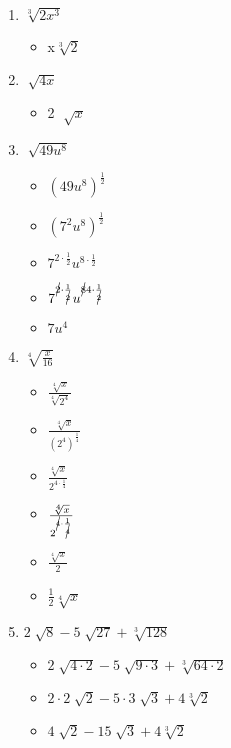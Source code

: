 \documentclass{article}
\begin{document}
\begin{onehalfspace}
\begin{enumerate}[start=29]
        \item $\sqrt[3]{2x^{3}}$
        \begin{itemize}
            \item x$\sqrt[3]{2}$
        \end{itemize}

        \item $\sqrt[]{4x}$
        \begin{itemize}
            \item 2 $\sqrt[]{x}$
        \end{itemize}

        \item $\sqrt[]{49u^{8}}$
        \begin{itemize}
            \item $(49u^{8})^{\frac{1}{2}}$
            \item $(7^{2}u^{8})^{\frac{1}{2}}$
            \item $7^{2 \cdot \frac{1}{2}}u^{8 \cdot \frac{1}{2}}$
            \item $7^{\cancel{2} \cdot \frac{1}{\cancel{2}}}u^{\cancel{8}4 \cdot \frac{1}{\cancel{2}}}$
            \item $7u^{4}$
        \end{itemize}

        \item $\sqrt[4]{\frac{x}{16}}$
        \begin{itemize}
            \item $\frac{\sqrt[4]{x}}{\sqrt[4]{2^{4}}}$
            \item $\frac{\sqrt[4]{x}}{(2^{4})^{\frac{1}{4}}}$
            \item $\frac{\sqrt[4]{x}}{2^{4 \cdot \frac{1}{4}}}$
            \item $\frac{\sqrt[4]{x}}{2^{\cancel{4} \cdot \frac{1}{\cancel{4}}}}$
            \item $\frac{\sqrt[4]{x}}{2}$
            \item $\frac{1}{2}\sqrt[4]{x}$
        \end{itemize}

        \item $2 \sqrt[]{8} - 5 \sqrt[]{27} + \sqrt[3]{128}$
        \begin{itemize}
            \item $2 \sqrt[]{4 \cdot 2} - 5 \sqrt[]{9 \cdot 3} + \sqrt[3]{64 \cdot 2}$
            \item $2 \cdot 2 \sqrt[]{2} - 5 \cdot 3 \sqrt[]{3} + 4 \sqrt[3]{2}$
            \item $4 \sqrt[]{2} - 15 \sqrt[]{3} + 4 \sqrt[3]{2}$
        \end{itemize}


\end{enumerate}
\end{onehalfspace}
\end{document}
